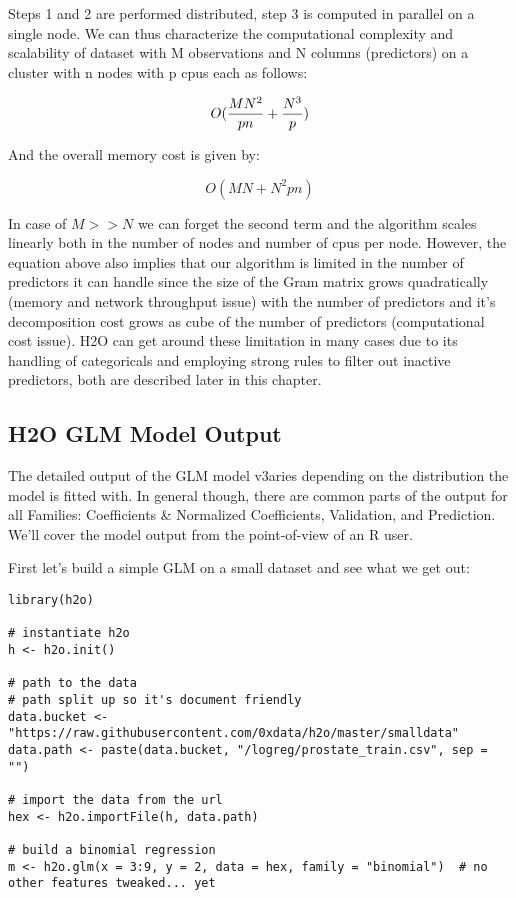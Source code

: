 \documentclass[11pt]{article}
\begin{document}
Steps 1 and 2 are performed distributed, step 3 is computed in parallel on a single node. We can thus characterize the computational complexity and scalability of dataset with M observations and N columns (predictors) on a cluster with n nodes with p cpus each as follows:

\[ O({MN^2 \over pn} + {N^3 \over p})\]

And the overall memory cost is given by:

\[ O(MN + N^2pn)\]

In case of $M >> N$ we can forget the second term and the algorithm scales linearly both in the number of nodes and number of cpus per node. However, the equation above also implies that our algorithm is limited in the number of predictors it can handle since the size of the Gram matrix grows quadratically (memory and network throughput issue) with the number of predictors and it's decomposition cost grows as cube of the number of predictors (computational cost issue). H2O can get around these limitation in many cases due to its handling of categoricals and employing strong rules to filter out inactive predictors, both are described later in this chapter.  


\subsection{H2O GLM Model Output}
The detailed output of the GLM model v3aries depending on the distribution the model is fitted with. In general though, there are common parts of the output for all Families: Coefficients \& Normalized Coefficients, Validation, and Prediction. We'll cover the model output from the point-of-view of an R user.

First let's build a simple GLM on a small dataset and see what we get out:

\begin{verbatim}
library(h2o)

# instantiate h2o
h <- h2o.init()

# path to the data
# path split up so it's document friendly
data.bucket <- "https://raw.githubusercontent.com/0xdata/h2o/master/smalldata"
data.path <- paste(data.bucket, "/logreg/prostate_train.csv", sep = "")

# import the data from the url
hex <- h2o.importFile(h, data.path)

# build a binomial regression
m <- h2o.glm(x = 3:9, y = 2, data = hex, family = "binomial")  # no other features tweaked... yet
\end{verbatim}
\end{document}
